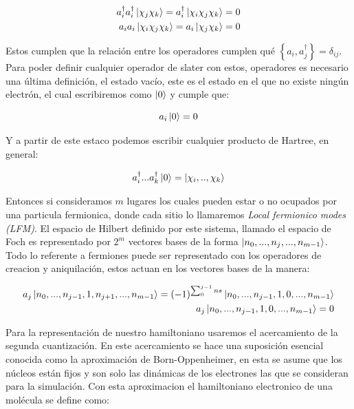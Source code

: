 \documentclass[12pt, oneside]{article}
\begin{document}
\begin{equation}
    \begin{split}
        a_i^\dagger a_i^\dagger\ket{\chi_j\chi_k}=a_i^\dagger\ket{\chi_i\chi_j\chi_k}=0\\
        a_i a_i\ket{\chi_i\chi_j\chi_k}=a_i\ket{\chi_j\chi_k}=0\\
    \end{split}
\end{equation}

Estos cumplen que la relación entre los operadores cumplen qué $\left\{a_i,a^\dagger_j \right\}=\delta_{ij}$.\\

Para poder definir cualquier operador de slater con estos, operadores es necesario una última definición, el estado vacío, este es el estado en el que no existe ningún electrón, el cual escribiremos como $\ket{0}$ y cumple que:

\begin{equation}
    a_i\ket{0}=0
\end{equation}

Y a partir de este estaco podemos escribir cualquier producto de Hartree, en general:

\begin{equation}
    a^\dagger_i...a^\dagger_k\ket{0}=\ket{\chi_i,..,\chi_k}
\end{equation}

Entonces si consideramos $m$ lugares los cuales pueden estar o no ocupados por una particula fermionica, donde cada sitio lo llamaremos \textit{Local fermionico modes (LFM)}. El espacio de Hilbert definido por este sistema, llamado el espacio de Foch es representado por $2^m$ vectores bases de la forma $\ket{n_0,...,n_j,...,n_{m-1}}$. Todo lo referente a fermiones puede ser representado con los operadores de creacion y aniquilación, estos actuan en los vectores bases de la manera\cite{bravyi2002fermionic}:

\begin{equation}
\begin{split}
    a_j\ket{n_0,...,n_{j-1},1,n_{j+1},...,n_{m-1}}=(-1)^{\sum_0^{j-1}ns}\ket{n_0,...,n_{j-1},1,0,...,n_{m-1}} \\
    a_j\ket{n_0,...,n_{j-1},1,0,...,n_{m-1}}=0
\end{split} 
\end{equation}

Para la representación de nuestro hamiltoniano usaremos el acercamiento de la segunda cuantización. En este acercamiento se hace una suposición esencial conocida como la aproximación de Born-Oppenheimer, en esta se asume que los núcleos están fijos y son solo las dinámicas de los electrones las que se consideran para la simulación. Con esta aproximacion el hamiltoniano electronico de una molécula se define como:
\end{document}
